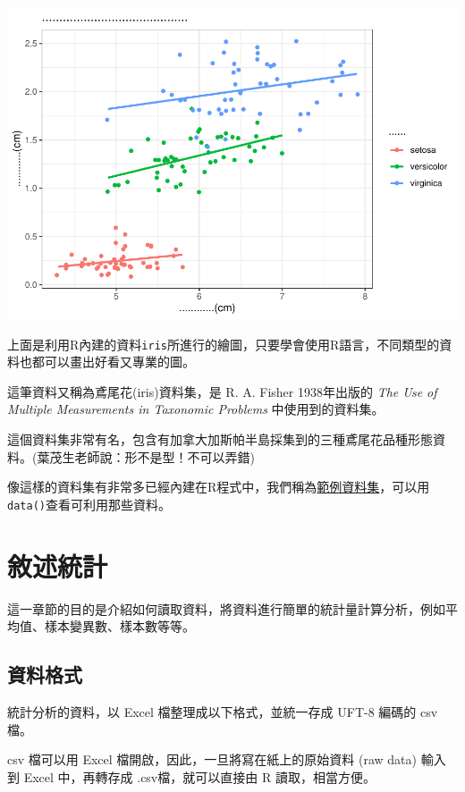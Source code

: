\documentclass[
]{book}
\begin{document}
\includegraphics{_main_files/figure-latex/unnamed-chunk-4-1.pdf}

上面是利用R內建的資料\texttt{iris}所進行的繪圖，只要學會使用R語言，不同類型的資料也都可以畫出好看又專業的圖。

這筆資料又稱為鳶尾花(iris)資料集，是 R. A. Fisher 1938年出版的 \emph{The Use of Multiple Measurements in Taxonomic Problems} 中使用到的資料集。

這個資料集非常有名，包含有加拿大加斯帕半島採集到的三種鳶尾花品種形態資料。(葉茂生老師說：形不是型！不可以弄錯)

像這樣的資料集有非常多已經內建在R程式中，我們稱為\href{https://stat.ethz.ch/R-manual/R-devel/library/datasets/html/00Index.html}{範例資料集}，可以用\texttt{data()}查看可利用那些資料。

\hypertarget{ux6558ux8ff0ux7d71ux8a08}{%
\chapter{敘述統計}\label{ux6558ux8ff0ux7d71ux8a08}}

這一章節的目的是介紹如何讀取資料，將資料進行簡單的統計量計算分析，例如平均值、樣本變異數、樣本數等等。

\hypertarget{ux8cc7ux6599ux683cux5f0f}{%
\section{資料格式}\label{ux8cc7ux6599ux683cux5f0f}}

統計分析的資料，以 Excel 檔整理成以下格式，並統一存成 UFT-8 編碼的 csv 檔。

csv 檔可以用 Excel 檔開啟，因此，一旦將寫在紙上的原始資料 (raw data) 輸入到 Excel 中，再轉存成 .csv檔，就可以直接由 R 讀取，相當方便。
\end{document}
